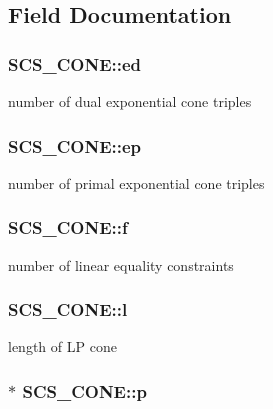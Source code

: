 \subsection{Field Documentation}
\hypertarget{struct_s_c_s___c_o_n_e_a5203baab9fb9cb5bf2bbbc7e8bb00d90}{
\subsubsection[{ed}]{ S\-C\-S\-\_\-\-C\-O\-N\-E\-::ed}}\label{struct_s_c_s___c_o_n_e_a5203baab9fb9cb5bf2bbbc7e8bb00d90}
number of dual exponential cone triples \hypertarget{struct_s_c_s___c_o_n_e_aa0a9b14042fc23dd86a5efa2184f0e9a}{
\subsubsection[{ep}]{ S\-C\-S\-\_\-\-C\-O\-N\-E\-::ep}}\label{struct_s_c_s___c_o_n_e_aa0a9b14042fc23dd86a5efa2184f0e9a}
number of primal exponential cone triples \hypertarget{struct_s_c_s___c_o_n_e_a06b3c39d2e6d717eb7c11df5743f40e1}{
\subsubsection[{f}]{ S\-C\-S\-\_\-\-C\-O\-N\-E\-::f}}\label{struct_s_c_s___c_o_n_e_a06b3c39d2e6d717eb7c11df5743f40e1}
number of linear equality constraints \hypertarget{struct_s_c_s___c_o_n_e_a99ffd0fa79fbc69a680913619ed65d14}{
\subsubsection[{l}]{ S\-C\-S\-\_\-\-C\-O\-N\-E\-::l}}\label{struct_s_c_s___c_o_n_e_a99ffd0fa79fbc69a680913619ed65d14}
length of L\-P cone \hypertarget{struct_s_c_s___c_o_n_e_ae1c69e9c2ac36186c7418c957d3017e8}{
\subsubsection[{p}]{$\ast$ S\-C\-S\-\_\-\-C\-O\-N\-E\-::p}}\label{struct_s_c_s___c_o_n_e_ae1c69e9c2ac36186c7418c957d3017e8}
